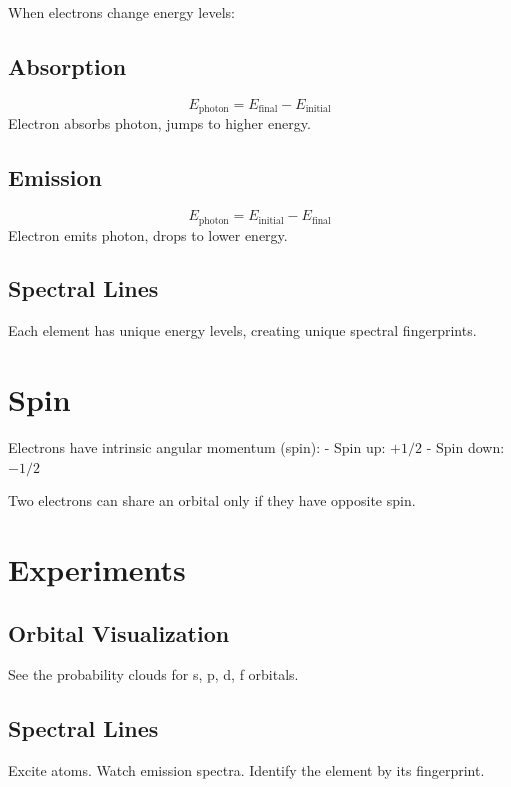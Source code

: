 \documentclass[
  11pt,
  letterpaper,
  twoside,
  openright]{book}
\begin{document}
When electrons change energy levels:

\subsection{Absorption}\label{absorption}

\[
E_{\text{photon}} = E_{\text{final}} - E_{\text{initial}}
\] Electron absorbs photon, jumps to higher energy.

\subsection{Emission}\label{emission}

\[
E_{\text{photon}} = E_{\text{initial}} - E_{\text{final}}
\] Electron emits photon, drops to lower energy.

\subsection{Spectral Lines}\label{spectral-lines}

Each element has unique energy levels, creating unique spectral
fingerprints.

\section{Spin}\label{spin}

Electrons have intrinsic angular momentum (spin): - Spin up: \(+1/2\) -
Spin down: \(-1/2\)

Two electrons can share an orbital only if they have opposite spin.

\section{Experiments}\label{experiments-2}

\subsection{Orbital Visualization}\label{orbital-visualization}

See the probability clouds for s, p, d, f orbitals.

\subsection{Spectral Lines}\label{spectral-lines-1}

Excite atoms. Watch emission spectra. Identify the element by its
fingerprint.
\end{document}
